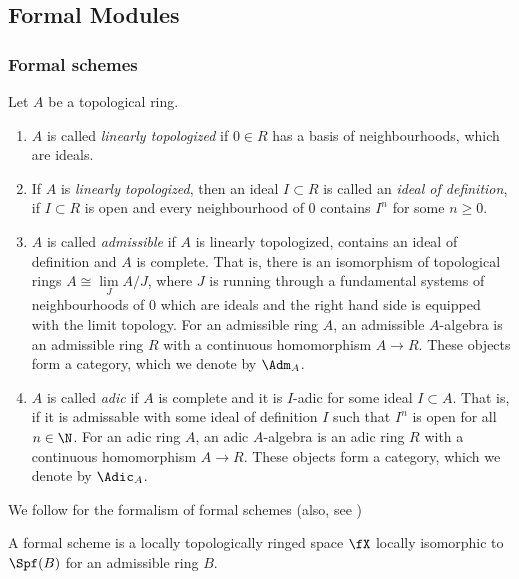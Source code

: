 \documentclass[../main.tex]{subfiles}
\begin{document}
\subsection{Formal Modules} %
\label{sub:Formal Modules}

\subsubsection{Formal schemes} %
\label{ssub:Formal schemes}

\begin{defi}\cite[Tag 07E8]{stacks-project}
    Let $A$ be a topological ring.
    \begin{enumerate}
        \item $A$ is called \emph{linearly topologized} if $0 \in R$ has a basis of 
            neighbourhoods, which are ideals.
        \item If $A$ is \emph{linearly topologized}, then an ideal $I \subset R$ is 
            called an \emph{ideal of definition}, if $I \subset R$ is open and
            every neighbourhood of $0$ contains $I^n$ for some $n \geq 0$.
        \item $A$ is called \emph{admissible} if $A$ is linearly topologized,
            contains an ideal of definition and $A$ is complete. That is, there
            is an isomorphism of topological rings $A \cong \underset{J}\lim
            A/J$, where $J$ is running through a fundamental systems of
            neighbourhoods of $0$ which are ideals and the right hand side is
            equipped with the limit topology. For an admissible ring $A$, 
            an admissible $A$-algebra is an admissible ring $R$ with a continuous
            homomorphism $A \to R$. These objects form a category, which we 
            denote by $\Adm_A$.
        \item $A$ is called \emph{adic} if $A$ is complete and it is $I$-adic
            for some ideal $I \subset A$. That is, if it is admissable with some
            ideal of definition $I$ such that $I^n$ is open for all $n \in \N$.
            For an adic ring $A$, an adic $A$-algebra is an adic ring $R$ with 
            a continuous homomorphism $A \to R$. These objects form a category,
            which we denote by $\Adic_A$. 
    \end{enumerate}
\end{defi}

We follow \cite{EGA} for the formalism of formal schemes (also, see
\cite[tag 0AHY]{stacks-project})
\begin{defi}
    A formal scheme is a locally topologically ringed space $\fX$ locally
    isomorphic to $\Spf(B)$ for an admissible ring $B$. 
\end{defi}
\end{document}

